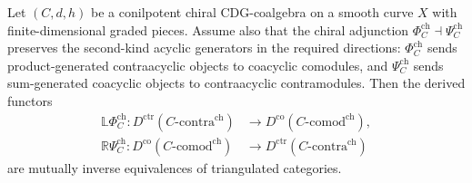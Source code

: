 \begin{theorem}
\label{thm:chiral-co-contra-correspondence}
\label{thm:chiral-positselski-5-2}
Let $(C, d, h)$ be a conilpotent chiral CDG-coalgebra on a smooth
curve $X$ with finite-dimensional graded pieces. Assume also that
the chiral adjunction
$\Phi_C^{\mathrm{ch}}\dashv\Psi_C^{\mathrm{ch}}$ preserves the
second-kind acyclic generators in the required directions:
$\Phi_C^{\mathrm{ch}}$ sends product-generated contraacyclic objects
to coacyclic comodules, and $\Psi_C^{\mathrm{ch}}$ sends
sum-generated coacyclic objects to contraacyclic contramodules. Then
the derived functors
\begin{align*}
\mathbb{L}\Phi_C^{\mathrm{ch}}\colon
D^{\mathrm{ctr}}(C\text{-}\mathrm{contra}^{\mathrm{ch}})
&\longrightarrow
D^{\mathrm{co}}(C\text{-}\mathrm{comod}^{\mathrm{ch}}), \\
\mathbb{R}\Psi_C^{\mathrm{ch}}\colon
D^{\mathrm{co}}(C\text{-}\mathrm{comod}^{\mathrm{ch}})
&\longrightarrow
D^{\mathrm{ctr}}(C\text{-}\mathrm{contra}^{\mathrm{ch}})
\end{align*}
are mutually inverse equivalences of triangulated categories.
\end{theorem}

